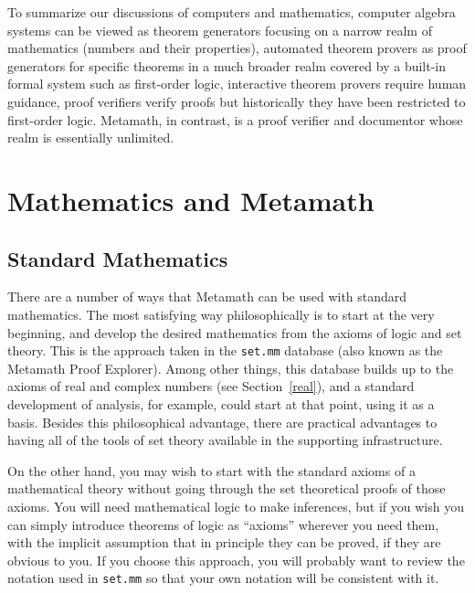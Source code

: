 To summarize our discussions of computers and mathematics, computer algebra
systems can be viewed as theorem generators focusing on a narrow realm of
mathematics (numbers and their properties), automated theorem provers as proof
generators for specific theorems in a much broader realm covered by a built-in
formal system such as first-order logic, interactive theorem
provers require human guidance, proof verifiers verify proofs but
historically they have been
restricted to first-order logic.
Metamath, in contrast,
is a proof verifier and documentor whose realm is essentially unlimited.

\section{Mathematics and Metamath}

\subsection{Standard Mathematics}

There are a number of ways that Metamath can be used with
standard mathematics.  The most satisfying way philosophically is to start at
the very beginning, and develop the desired mathematics from the axioms of
logic and set theory.  This is the approach taken in the
\texttt{set.mm}%
database (also known as the Metamath Proof Explorer).
Among other things, this database builds up to the
axioms of real and complex numbers (see Section~\ref{real}), and a standard development of analysis, for
example, could start at that point, using it as a basis.   Besides this
philosophical advantage, there are practical advantages to having all of the
tools of set theory available in the supporting infrastructure.

On the other hand, you may wish to start with the standard axioms of a
mathematical theory without going through the set theoretical proofs of those
axioms.  You will need mathematical logic to make inferences, but if you wish
you can simply introduce theorems of logic as
``axioms'' wherever you need them, with the implicit assumption
that in principle they can be proved, if they are obvious to you.  If you
choose this approach, you will probably want to review the notation used in
\texttt{set.mm} so that your own
notation will be consistent with it.

